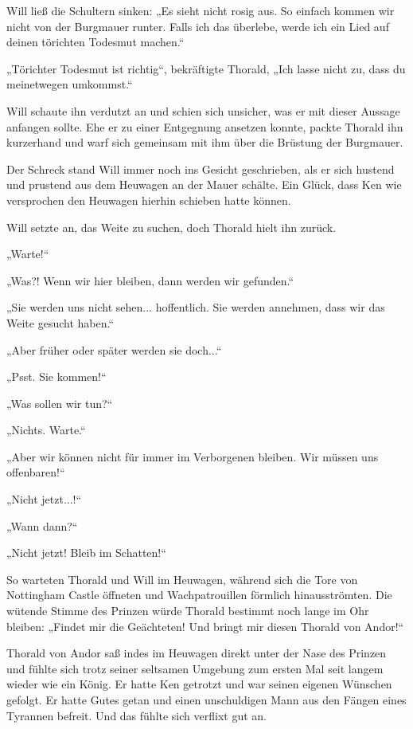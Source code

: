 \documentclass[10pt, a4paper, oneside]{book}
\begin{document}
Will ließ die Schultern sinken: „Es sieht nicht rosig aus. So einfach kommen wir nicht von der Burgmauer runter. Falls ich das überlebe, werde ich ein Lied auf deinen törichten Todesmut machen.“

„Törichter Todesmut ist richtig“, bekräftigte Thorald, „Ich lasse nicht zu, dass du meinetwegen umkommst.“

Will schaute ihn verdutzt an und schien sich unsicher, was er mit dieser Aussage anfangen sollte. Ehe er zu einer Entgegnung ansetzen konnte, packte Thorald ihn kurzerhand und warf sich gemeinsam mit ihm über die Brüstung der Burgmauer.

Der Schreck stand Will immer noch ins Gesicht geschrieben, als er sich hustend und prustend aus dem Heuwagen an der Mauer schälte. Ein Glück, dass Ken wie versprochen den Heuwagen hierhin schieben hatte können.

Will setzte an, das Weite zu suchen, doch Thorald hielt ihn zurück.

„Warte!“

„Was?! Wenn wir hier bleiben, dann werden wir gefunden.“

„Sie werden uns nicht sehen... hoffentlich. Sie werden annehmen, dass wir das Weite gesucht haben.“

„Aber früher oder später werden sie doch...“

„Psst. Sie kommen!“

„Was sollen wir tun?“

„Nichts. Warte.“

„Aber wir können nicht für immer im Verborgenen bleiben. Wir müssen uns offenbaren!“

„Nicht jetzt...!“

„Wann dann?“

„Nicht jetzt! Bleib im Schatten!“

So warteten Thorald und Will im Heuwagen, während sich die Tore von Nottingham Castle öffneten und Wachpatrouillen förmlich hinausströmten. Die wütende Stimme des Prinzen würde Thorald bestimmt noch lange im Ohr bleiben: „Findet mir die Geächteten! Und bringt mir diesen Thorald von Andor!“

Thorald von Andor saß indes im Heuwagen direkt unter der Nase des Prinzen und fühlte sich trotz seiner seltsamen Umgebung zum ersten Mal seit langem wieder wie ein König. Er hatte Ken getrotzt und war seinen eigenen Wünschen gefolgt. Er hatte Gutes getan und einen unschuldigen Mann aus den Fängen eines Tyrannen befreit. Und das fühlte sich verflixt gut an.\bigskip
\end{document}
